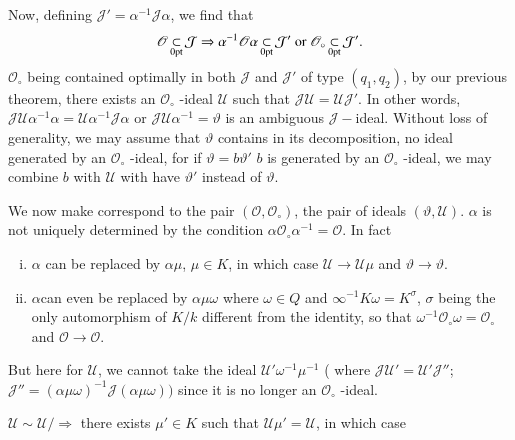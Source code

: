Now, defining $ \mathcal{J}' = \alpha^{-1} \mathcal{J} \alpha $, we find that 
$$
\mathscr{O} \subs_{\0pt} \mathcal{J} \Rightarrow \alpha^{-1}
\mathscr{O}\alpha  \subs_{\0pt} \mathcal{J}'  \text{ or }
\mathscr{O}_\circ \subs_{\0pt} \mathcal{J}'.  
 $$
$ \mathscr{O}_\circ $ being contained optimally in both  $ \mathcal{J}
$ and $ \mathcal{J}' $ of type $ ( q_1, q_2 ) $, by our previous
theorem, there exists an $ \mathscr{O}_\circ $ -ideal $ \mathscr{U} $
such that $ \mathcal{J} \mathscr{U} = \mathscr{U} \mathcal{J}' $. In
other  words, $ \mathcal{J} \mathscr{U} \alpha^{-1} \alpha =
\mathscr{U} \alpha^{-1} \mathcal{J} \alpha $ or $ \mathcal{J}
\mathscr{U} \alpha^{-1} = \vartheta $ is an ambiguous  $ \mathcal{J}-
$ideal. Without loss of generality, we may assume that $ \vartheta $
contains in its  decomposition, no ideal generated by an $
\mathscr{O}_\circ $  -ideal, for if $ \vartheta = b \vartheta' $ $ b $
is generated by an $ \mathscr{O}_\circ $ -ideal, we may combine  $b$
with $ \mathscr{U} $ with  have $ \vartheta' $ instead of $ \vartheta
$.  
 
We now make correspond to the pair $ ( \mathscr{O}, \mathscr{O}_\circ
) $, the pair of ideals  $ ( \vartheta, \mathscr{U} ) $. $ \alpha $
is not uniquely determined by the condition $ \alpha
\mathscr{O}_\circ \alpha^{-1} = \mathscr{O} $. In fact 
 
\begin{enumerate}[i)]
\item $ \alpha $ can be replaced by $ \alpha \mu $, $ \mu \in K $,
  in which case  $ \mathscr{U} \rightarrow \mathscr{U} \mu  $ and  $
  \vartheta \rightarrow \vartheta $. 
\item $ \alpha$\pageoriginale can even be replaced by $ \alpha \mu \omega $
  where  $ \omega \in Q $ and $ \infty^{-1} K \omega = K^\sigma $, $
  \sigma $ being the only automorphism of  $ K / k $ different from
  the identity, so that $ \omega^{-1}  \mathscr{O}_\circ \omega =
  \mathscr{O}_\circ $ and  $ \mathscr{O} \rightarrow \mathscr{O} $.  
\end{enumerate} 
 
 But here for  $ \mathscr{U} $, we cannot take the ideal $
 \mathscr{U}' \omega^{-1} \mu^{-1} $ ( where $ \mathcal{J}
 \mathscr{U}' = \mathscr{U}' \mathcal{J} '' $;  $ \mathcal{J}''  = (
 \alpha \mu \omega ) ^{-1} \mathcal{J} ( \alpha \mu \omega )) $
 since it is no longer an $ \mathscr{O}_\circ $ -ideal. 
 
 $\mathscr{U} \sim \mathscr{U}/ \Rightarrow $ there exists $ \mu'\in
 K $ such that $ \mathscr{U} \mu' = \mathscr{U} $, in which case  
 

